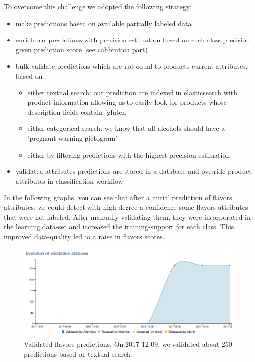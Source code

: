 To overcome this challenge we adopted the following strategy:

\begin{itemize}
	\item make predictions based on available partially labeled data
	\item enrich our predictions with precision estimation based on each class precision given prediction score (see calibration part)
	\item bulk validate predictions which are not equal to products current attributes, based on:
	\begin{itemize}
		\item either textual search: our prediction are indexed in elasticsearch with product information allowing us to easily look for products whose description fields contain 'gluten'
		\item either categorical search: we know that all alcohols should have a 'pregnant warning pictogram'
		\item either by filtering predictions with the highest precision estimation
	\end{itemize}
	\item validated attributes predictions are stored in a database and override product attributes in classification workflow
\end{itemize}

In the following graphs, you can see that after a initial prediction of flavors attributes, we could detect with high degree a confidence some flavors attributes that were not labeled. After manually validating them, they were incorporated in the learning data-set and increased the training-support for each class. This improved data-quality led to a raise in flavors scores.

\begin{figure}[H]
\centering
\includegraphics[scale=0.5]{./images/incompletely-labeled/validation-flavors.png}
\caption{Validated flavors predictions. On 2017-12-09, we validated about 250 predictions based on textual search.}
\end{figure}


